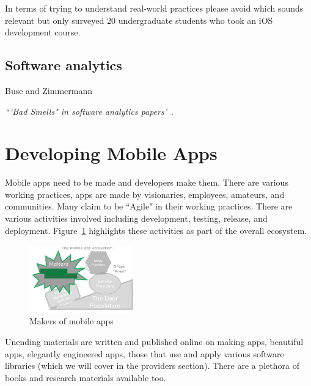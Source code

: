 In terms of trying to understand real-world practices please avoid \citet{santos2016_investigating_the_adoption_of_agile_practices_by_20_undergrad_students_in_mobile_app_devt} which sounds relevant but only surveyed 20 undergraduate students who took an iOS development course. 

\subsection{Software analytics}
Buse and Zimmermann

\emph{```Bad Smells" in software analytics papers'}~\citep{menzies2019_badsmells_in_software_analytics}.


\section{Developing Mobile Apps}
Mobile apps need to be made and developers make them. There are various working practices, apps are made by visionaries, employees, amateurs, and communities. Many claim to be ``Agile" in their working practices. There are various activities involved including development, testing, release, and deployment. Figure~\ref{fig:my_mobile-app-makers} highlights these activities as part of the overall ecosystem.

\begin{figure}
    \centering
    \includegraphics[width=0.4\textwidth]{images/my/the-mobile-app-ecosystem-makers-dtrd.png}
    \caption{Makers of mobile apps}
    \label{fig:my_mobile-app-makers}
\end{figure}

Unending materials are written and published online on making apps, beautiful apps, elegantly engineered apps, those that use and apply various software libraries (which we will cover in the providers section). There are a plethora of books and research materials available too. 



